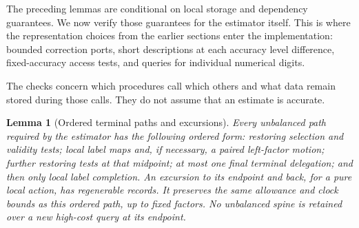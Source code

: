 \documentclass[11pt]{article}
\numberwithin{equation}{section}
\newtheorem{lemma}[theorem]{Lemma}
\theoremstyle{definition}
\theoremstyle{remark}
\begin{document}
The preceding lemmas are conditional on local storage and dependency guarantees. We now verify those guarantees for the estimator itself. This is where the representation choices from the earlier sections enter the implementation: bounded correction ports, short descriptions at each accuracy level difference, fixed-accuracy access tests, and queries for individual numerical digits.

The checks concern which procedures call which others and what data remain stored during those calls. They do not assume that an estimate is accurate.

\begin{lemma}[Ordered terminal paths and excursions]\label{lem:ctrl-paths}
Every unbalanced path required by the estimator has the following
ordered form: restoring selection and validity tests; local label maps
and, if necessary, a paired left-factor motion; further restoring tests
at that midpoint; at most one final terminal delegation; and then only
local label completion.  An excursion to its endpoint and back, for a
pure local action, has regenerable records.  It preserves the same
allowance and clock bounds as this ordered path, up to fixed factors.
No unbalanced spine is retained over a new high-cost query at its
endpoint.
\end{lemma}
\end{document}
